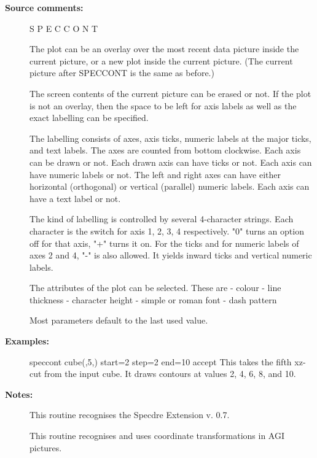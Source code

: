 \begin{description}
\begin{description}
\end{description}

\item [\textbf{Source comments:}]
\begin{terminalv}
   S P E C C O N T

   The plot can be an overlay over the most recent data picture
   inside the current picture, or a new plot inside the current
   picture. (The current picture after SPECCONT is the same as
   before.)

   The screen contents of the current picture can be erased or not.
   If the plot is not an overlay, then the space to be left for axis
   labels as well as the exact labelling can be specified.

   The labelling consists of axes, axis ticks, numeric labels at the
   major ticks, and text labels. The axes are counted from bottom
   clockwise. Each axis can be drawn or not. Each drawn axis can have
   ticks or not. Each axis can have numeric labels or not. The left
   and right axes can have either horizontal (orthogonal) or vertical
   (parallel) numeric labels. Each axis can have a text label or not.

   The kind of labelling is controlled by several 4-character
   strings. Each character is the switch for axis 1, 2, 3, 4
   respectively. "0" turns an option off for that axis, "+" turns it
   on. For the ticks and for numeric labels of axes 2 and 4, "-" is
   also allowed. It yields inward ticks and vertical numeric labels.

   The attributes of the plot can be selected. These are
   -  colour
   -  line thickness
   -  character height
   -  simple or roman font
   -  dash pattern

   Most parameters default to the last used value.
\end{terminalv}

\item [\textbf{Examples:}]
\begin{terminalv}
speccont cube(,5,) start=2 step=2 end=10 accept
   This takes the fifth xz-cut from the input cube. It draws
   contours at values 2, 4, 6, 8, and 10.
\end{terminalv}

\item [\textbf{Notes:}]
This routine recognises the Specdre Extension v. 0.7.

This routine recognises and uses coordinate transformations in
AGI pictures.
\end{description}
